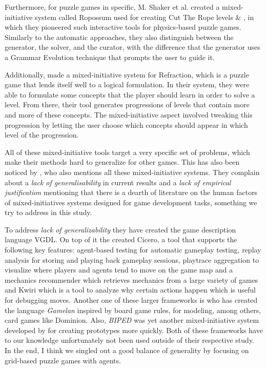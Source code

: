 Furthermore, for puzzle games in specific, M. Shaker et al. created a mixed-initiative system called Ropossum used for creating Cut The Rope levels \cite{Shaker2013} \& \cite{Shaker2013Ropossum}, in which they pioneered such interactive tools for physics-based puzzle games. Similarly to the automatic approaches, they also distinguish between the generator, the solver, and the curator, with the difference that the generator uses a Grammar Evolution technique that prompts the user to guide it.

Additionally, \cite{Butler2013} made a mixed-initiative system for Refraction, which is a puzzle game that lends itself well to a logical formulation. In their system, they were able to formulate some concepts that the player should learn in order to solve a level. From there, their tool generates progressions of levels that contain more and more of these concepts. The mixed-initiative aspect involved tweaking this progression by letting the user choose which concepts should appear in which level of the progression.

All of these mixed-initiative tools target a very specific set of problems, which make their methods hard to generalize for other games.
This has also been noticed by \cite{MacHado2018}, who also mentions all these mixed-initiative systems. They complain about a \textit{lack of generalisability} in current results and a \textit{lack of empirical justification} mentioning that there is a dearth of literature on the human factors of mixed-initiatives systems designed for game development tasks, something we try to address in this study.

To address \textit{lack of generalizability} they have created the game description language VGDL. 
On top of it the created Cicero, a tool that supports the following key features: agent-based testing for automatic gameplay testing, replay analysis for storing and playing back gameplay sessions, playtrace aggregation to visualize where players and agents tend to move on the game map and a mechanics recommender which retrieves mechanics from a large variety of games and Kwiri which is a tool to analyze why certain actions happen which is useful for debugging moves. 
Another one of these larger frameworks is \cite{Osborn2011} who has created the language \textit{Gamelan} inspired by board game rules, for modeling, among others, card games like Dominion. Also, \textit{BIPED} was yet another mixed-initiative system developed by \cite{Smith2008} for creating prototypes more quickly. Both of these frameworks have to our knowledge unfortunately not been used outside of their respective study.
In the end, I think we singled out a good balance of generality by focusing on grid-based puzzle games with agents.

